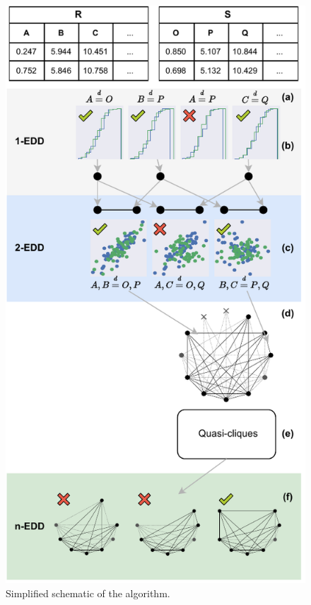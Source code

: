 \begin{multicols}{2}

\begin{figure}[H]
    \centering
    \includegraphics[width=\linewidth]{images/presq/pipeline}
    \caption{Simplified schematic of the algorithm.}
    \label{fig:presq_pipeline}
\end{figure}


\end{multicols}

